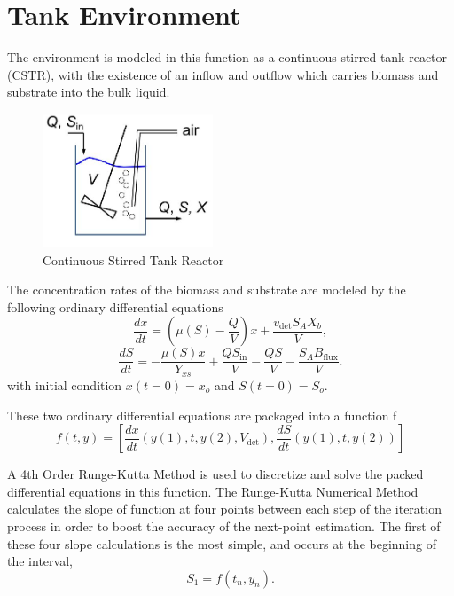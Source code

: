 \documentclass[letterpaper, twoside]{article}
\numberwithin{equation}{section}
\begin{document}
\section{Tank Environment}
The environment is modeled in this function as a continuous stirred tank reactor (CSTR), with the existence of an inflow and outflow which carries biomass and substrate into the bulk liquid. 

\begin{figure}[H]
\centering
\includegraphics[width=2in]{CSTR_model.jpg}
\caption{Continuous Stirred Tank Reactor}
\end{figure}

The concentration rates of the biomass and substrate are modeled by the following ordinary differential equations
\begin{equation} \label{eq: BiomassEquation}
  \frac{dx}{dt} = \left(\mu(S) - \frac{Q}{V}\right) x +\frac{ v_{\mathrm{det}} S_A X_b}{V},
\end{equation}
\begin{equation} \label{eq: SubstrateEquation}
  \frac{dS}{dt} = -\frac{\mu(S) x}{Y_{xs}} + \frac{Q S_{\mathrm{in}}}{V} - \frac{Q S}{V} - \frac{S_A B_{\mathrm{flux}}}{V}.
\end{equation}
with initial condition $x(t=0)=x_o$ and $S(t=0)=S_o$.

These two ordinary differential equations are packaged into a function f
\begin{equation} \label{eq: ODEpackagef}
  f(t,y) = \left[\frac{dx}{dt}\left(y(1), t, y(2), V_\mathrm{det}\right) , 
	      \frac{dS}{dt}\left(y(1), t, y(2)\right)\right]
\end{equation}

A 4th Order Runge-Kutta Method is used to discretize and solve the packed differential equations in this function. The Runge-Kutta Numerical Method calculates the slope of function at four points between each step of the iteration process in order to boost the accuracy of the next-point estimation. The first of these four slope calculations is the most simple, and occurs at the beginning of the interval,
\begin{equation} \label{eq: S_1}
  S_1 = f(t_n,y_n).
\end{equation}
\end{document}
